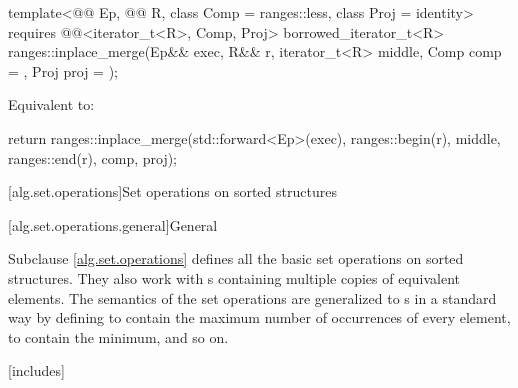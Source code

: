 \begin{itemdecl}
template<@@ Ep, @@ R, class Comp = ranges::less,
         class Proj = identity>
  requires @@<iterator_t<R>, Comp, Proj>
  borrowed_iterator_t<R>
    ranges::inplace_merge(Ep&& exec, R&& r, iterator_t<R> middle, Comp comp = {},
                          Proj proj = {});
\end{itemdecl}

\begin{itemdescr}
\pnum
\effects
Equivalent to:
\begin{codeblock}
return ranges::inplace_merge(std::forward<Ep>(exec), ranges::begin(r), middle,
                             ranges::end(r), comp, proj);
\end{codeblock}
\end{itemdescr}

[alg.set.operations]{Set operations on sorted structures}

[alg.set.operations.general]{General}

\pnum
Subclause \ref{alg.set.operations} defines all the basic set operations on sorted structures.
They also work with s
containing multiple copies of equivalent elements.
The semantics of the set operations are generalized to s
in a standard way by defining 
to contain the maximum number of occurrences of every element,
 to contain the minimum, and so on.

[includes]{}


